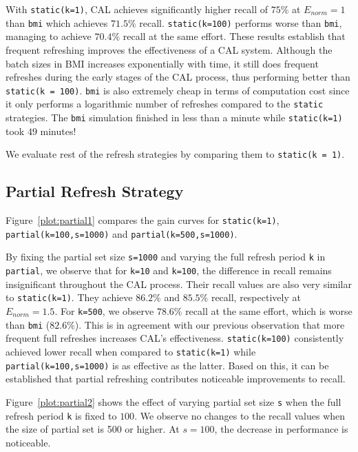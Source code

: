 With \texttt{static(k=1)}, CAL achieves significantly higher recall of
$75\%$ at $E_{norm} = 1$ than \texttt{bmi} which achieves $71.5\%$
recall.  \texttt{static(k=100)} performs worse than
\texttt{bmi}, managing to achieve $70.4\%$ recall at the same effort.
These results establish that frequent refreshing improves the effectiveness of a
CAL system.
Although the batch sizes in BMI increases exponentially with time, it still does
frequent refreshes during the early stages of the CAL process, thus performing
better than \texttt{static(k = 100)}. \texttt{bmi} is also
extremely cheap in terms of computation cost since it only performs a
logarithmic number of refreshes compared to the \texttt{static} strategies.
The \texttt{bmi} simulation finished in less than a minute while
\texttt{static(k=1)} took $49$ minutes!

We evaluate rest of the refresh strategies by comparing them to
\texttt{static(k = 1)}.

\subsection*{Partial Refresh Strategy}
Figure~\ref{plot:partial1} compares the gain curves for
\texttt{static(k=1)}, \texttt{partial(k=100,s=1000)} and
\texttt{partial(k=500,s=1000)}.

By fixing the partial set size \texttt{s=1000} and varying the full refresh
period \texttt{k} in \texttt{partial}, we observe
that for \texttt{k=10} and \texttt{k=100}, the difference in recall remains insignificant throughout the
CAL process. Their recall values are also very similar to
\texttt{static(k=1)}. They achieve $86.2\%$ and $85.5\%$ recall, respectively at
$E_{norm} = 1.5$. For \texttt{k=500}, we observe $78.6\%$ recall at the
same effort, which is worse than \texttt{bmi} ($82.6\%$). This is in
agreement with our previous observation that more frequent full refreshes
increases CAL's effectiveness. \texttt{static(k=100)}
consistently achieved lower recall when compared to \texttt{static(k=1)} while
\texttt{partial(k=100,s=1000)} is as effective as the latter. Based
on this, it can be established that partial refreshing contributes noticeable
improvements to recall.

Figure~\ref{plot:partial2} shows the effect of varying partial set size
\texttt{s} when the full refresh period \texttt{k} is fixed to $100$. We observe
no changes to the recall values when the size of partial set is 500 or higher. At
$s=100$, the decrease in performance is noticeable.

